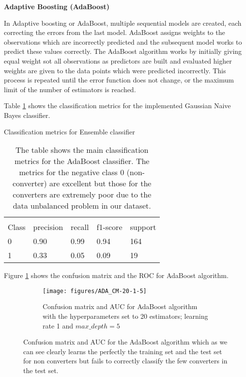 \documentclass[11pt]{article}
\theoremstyle{definition}
\theoremstyle{remark}
\begin{document}
\textbf{Adaptive Boosting (AdaBoost)}

In Adaptive boosting or AdaBoost, multiple sequential models are created, each correcting the errors from the last model. AdaBoost assigns weights to the observations which are incorrectly predicted and the subsequent model works to predict these values correctly. The AdaBoost algorithm works by initially giving equal weight sot all observations as predictors are built and evaluated 
higher weights are given to the data points which were predicted incorrectly. This process is repeated until the error function does not change, or the maximum limit of the number of estimators is reached.

Table \ref{tab:ada} shows the classification metrics for the implemented Gaussian Naive Bayes classifier.
\begin{table}[H]
\caption{Classification metrics for Ensemble classifier} 
\begin{center} 
\begin{tabular}{lllll}
\hline
\multicolumn{1}{c}{} \\
Class & precision & recall & f1-score & support     \\
\hline
0 & 0.90  &    0.99   &   0.94   &    164 \\
1 & 0.33  &    0.05   &   0.09   &    19 \\
\hline
\end{tabular}
\caption{The table shows the main classification metrics for the AdaBoost classifier. The metrics for the negative class 0 (non-converter) are excellent but those for the converters are extremely poor due to the data unbalanced problem in our dataset.
} \label{tab:ada} 
\end{center}
\end{table}

Figure \ref{fig:rf_ada} shows the confusion matrix and the ROC for AdaBoost algorithm. 
\begin{figure}[H]
    \centering
    \begin{subfigure}[t]{.8\textwidth}
        \centering
        \texttt{[image: figures/ADA\_CM-20-1-5]}
        \caption{Confusion matrix and AUC for AdaBoost algorithm with the hyperparameters set to 20 estimators; learning rate 1 and  $max\_depth=5$}
    \end{subfigure}

    
    \caption{Confusion matrix and AUC for the AdaBoost algorithm which as we can see clearly learns the perfectly the training set and the test set for non converters but fails to correctly classify the few converters in the test set. } \label{fig:rf_ada}
\end{figure}
\end{document}
